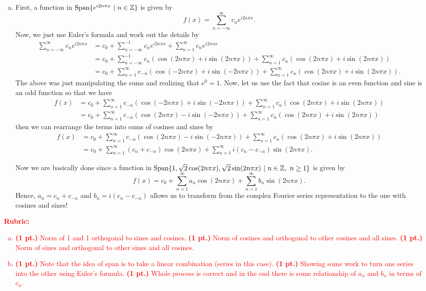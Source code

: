 \documentclass[12pt]{article} %
\begin{document}
\begin{solution}
\begin{enumerate}[(a)]
\item First, a function in $\operatorname{Span}\{e^{i2n\pi x} ~|~ n \in \mathbb{Z}\}$ is given by
\[
f(x) = \sum_{n=-\infty}^\infty c_n e^{i2n \pi x}.
\]
Now, we just use Euler's formula and work out the details by
\begin{align*}
\sum_{n=-\infty}^\infty c_n e^{i2n \pi x} &= c_0 + \sum_{n=-\infty}^{-1} c_n e^{i2n \pi x} + \sum_{n=1}^\infty c_n e^{i2n \pi x} \\
&= c_0 + \sum_{n=-\infty}^{-1} c_n (\cos(2n\pi x) + i \sin(2n\pi x)) + \sum_{n=1}^{\infty} c_n (\cos(2n\pi x) + i \sin(2n\pi x))\\
&= c_0 + \sum_{n=1}^{\infty} c_{-n} (\cos(-2n\pi x) + i \sin(-2n\pi x)) + \sum_{n=1}^{\infty} c_n (\cos(2n\pi x) + i \sin(2n\pi x)).
\end{align*}
The above was just manipulating the sums and realizing that $e^{0}=1$. Now, let us use the fact that cosine is an even function and sine is an odd function so that we have
\begin{align*}
f(x) &= c_0 + \sum_{n=1}^{\infty} c_{-n} (\cos(-2n\pi x) + i \sin(-2n\pi x)) + \sum_{n=1}^{\infty} c_n (\cos(2n\pi x) + i \sin(2n\pi x))\\
&= c_0 + \sum_{n=1}^{\infty} c_{-n} (\cos(2n\pi x) - i \sin(-2n\pi x)) + \sum_{n=1}^{\infty} c_n (\cos(2n\pi x) + i \sin(2n\pi x))
\end{align*}
then we can rearrange the terms into sums of cosines and sines by
\begin{align*}
f(x) &= c_0 + \sum_{n=1}^{\infty} c_{-n} (\cos(2n\pi x) - i \sin(-2n\pi x)) + \sum_{n=1}^{\infty} c_n (\cos(2n\pi x) + i \sin(2n\pi x))\\
&= c_0 + \sum_{n=1}^\infty (c_{n}+c_{-n})\cos(2n\pi x) + \sum_{n=1}^\infty i(c_n-c_{-n}) \sin(2n\pi x).
\end{align*}

Now we are basically done since a function in $\operatorname{Span}\{1,\sqrt{2}\cos(2n \pi x), \sqrt{2}\sin(2n \pi x) ~|~ n \in \mathbb{Z}, ~ n\geq 1\}$ is given by
\[
f(x) = c_0 + \sum_{n=1}^\infty a_n \cos(2n\pi x) + \sum_{n=1}^\infty b_n \sin(2n\pi x).
\]
Hence, $a_n = c_n + c_{-n}$ and $b_n = i(c_n - c_{-n})$ allows us to transform from the complex Fourier series representation to the one with cosines and sines!
\end{enumerate}
\end{solution}
\vspace*{1cm}
\textcolor{red}{
\noindent \textbf{Rubric:}
\begin{enumerate}[(a)]
    \item \textbf{(1 pt.)} Norm of 1 and 1 orthogonal to sines and cosines. \textbf{(1 pt.)} Norm of cosines and orthogonal to other cosines and all sines.  \textbf{(1 pt.)} Norm of sines and orthogonal to other sines and all cosines. 
	\item \textbf{(1 pt.)} Note that the idea of span is to take a linear combination (series in this case). \textbf{(1 pt.)} Showing some work to turn one series into the other using Euler's formula. \textbf{(1 pt.)} Whole process is correct and in the end there is some relationship of $a_n$ and $b_n$ in terms of $c_n$.
\end{enumerate}
}
\end{document}
